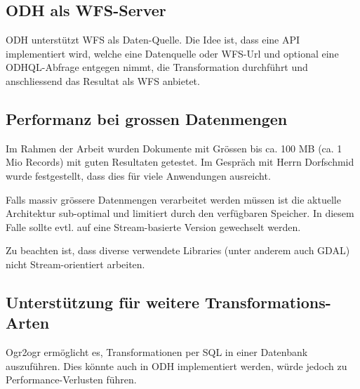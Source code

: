 \subsection{ODH als WFS-Server}
ODH unterstützt WFS als Daten-Quelle. Die Idee ist, dass eine API implementiert wird, welche eine Datenquelle oder WFS-Url und optional eine ODHQL-Abfrage entgegen nimmt, die Transformation durchführt und anschliessend das Resultat als WFS anbietet.

\subsection{Performanz bei grossen Datenmengen}
Im Rahmen der Arbeit wurden Dokumente mit Grössen bis ca. 100 MB (ca. 1 Mio Records) mit guten Resultaten getestet. Im Gespräch mit Herrn Dorfschmid wurde festgestellt, dass dies für viele Anwendungen ausreicht.

Falls massiv grössere Datenmengen verarbeitet werden müssen ist die aktuelle Architektur sub-optimal und limitiert durch den verfügbaren Speicher. In diesem Falle sollte evtl. auf eine Stream-basierte Version gewechselt werden.

Zu beachten ist, dass diverse verwendete Libraries (unter anderem auch GDAL) nicht Stream-orientiert arbeiten.

\subsection{Unterstützung für weitere Transformations-Arten}
Ogr2ogr ermöglicht es, Transformationen per SQL in einer Datenbank auszuführen. Dies könnte auch in ODH implementiert werden, würde jedoch zu Performance-Verlusten führen.
